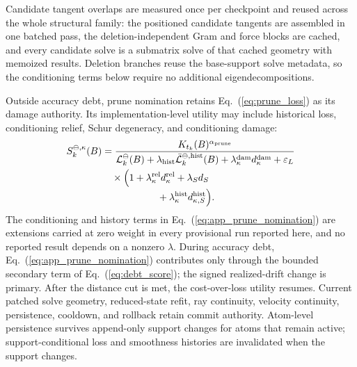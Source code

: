 \documentclass[
  reprint,
  amsmath,
  amssymb,
  aps,
  pra,
  nofootinbib,
  superscriptaddress,
  floatfix
]{revtex4-2}
\newcommand{\eps}{\varepsilon}
\begin{document}
Candidate tangent overlaps are measured once per checkpoint and reused across the whole structural family: the positioned candidate tangents are assembled in one batched pass, the deletion-independent Gram and force blocks are cached, and every candidate solve is a submatrix solve of that cached geometry with memoized results.  Deletion branches reuse the base-support solve metadata, so the conditioning terms below require no additional eigendecompositions.

Outside accuracy debt, prune nomination retains Eq.~(\ref{eq:prune_loss}) as its damage authority.  Its implementation-level utility may include historical loss, conditioning relief, Schur degeneracy, and conditioning damage:
\begin{equation}
\begin{aligned}
S_k^{\ominus,\kappa}(B)
&=\frac{K_{t_k}(B)^{\alpha_{\rm prune}}}{
\mathcal L_k^{\ominus}(B)
+\lambda_{\rm hist}\bar{\mathcal L}_k^{\ominus,\rm hist}(B)
+\lambda_{\kappa}^{\rm dam}d_{\kappa}^{\rm dam}
+\eps_L}\\
&\quad\times
\Bigl(1+\lambda_{\kappa}^{\rm rel}d_{\kappa}^{\rm rel}
+\lambda_Sd_S\\[-2pt]
&\hspace{5.7em}
+\lambda_{\kappa}^{\rm hist}d_{\kappa,S}^{\rm hist}\Bigr).
\end{aligned}
\label{eq:app_prune_nomination}
\end{equation}
The conditioning and history terms in Eq.~(\ref{eq:app_prune_nomination}) are extensions carried at zero weight in every provisional run reported here, and no reported result depends on a nonzero $\lambda$.  During accuracy debt, Eq.~(\ref{eq:app_prune_nomination}) contributes only through the bounded secondary term of Eq.~(\ref{eq:debt_score}); the signed realized-drift change is primary.  After the distance cut is met, the cost-over-loss utility resumes.  Current patched solve geometry, reduced-state refit, ray continuity, velocity continuity, persistence, cooldown, and rollback retain commit authority.  Atom-level persistence survives append-only support changes for atoms that remain active; support-conditional loss and smoothness histories are invalidated when the support changes.
\end{document}
